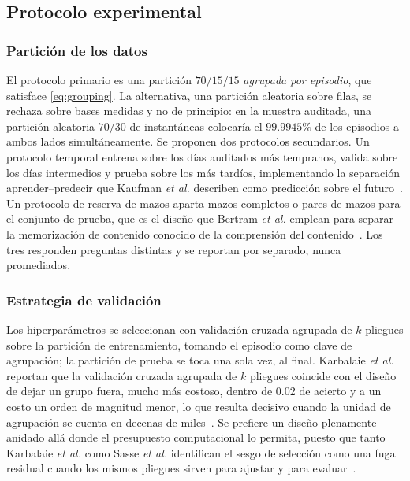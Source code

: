 \documentclass[conference]{IEEEtran}
\begin{document}
\subsection{Protocolo experimental}
\label{subsec:protocol}

\subsubsection{Partici\'on de los datos}
El protocolo primario es una partici\'on $70/15/15$ \emph{agrupada por
episodio}, que satisface \eqref{eq:grouping}. La alternativa, una
partici\'on aleatoria sobre filas, se rechaza sobre bases medidas y no de
principio: en la muestra auditada, una partici\'on aleatoria $70/30$ de
instant\'aneas colocar\'ia el $99.9945\%$ de los episodios a ambos lados
simult\'aneamente. Se proponen dos protocolos secundarios. Un protocolo
temporal entrena sobre los d\'ias auditados m\'as tempranos, valida sobre
los d\'ias intermedios y prueba sobre los m\'as tard\'ios, implementando la
separaci\'on aprender--predecir que Kaufman \textit{et al.} describen como
predicci\'on sobre el futuro~\cite{kaufman_leakage_2011}. Un protocolo de
reserva de mazos aparta mazos completos o pares de mazos para el conjunto de
prueba, que es el dise\~no que Bertram \textit{et al.} emplean para separar
la memorizaci\'on de contenido conocido de la comprensi\'on del
contenido~\cite{bertram_cardrepresentations_2024}. Los tres responden
preguntas distintas y se reportan por separado, nunca promediados.

\subsubsection{Estrategia de validaci\'on}
Los hiperpar\'ametros se seleccionan con validaci\'on cruzada agrupada de
$k$ pliegues sobre la partici\'on de entrenamiento, tomando el episodio como
clave de agrupaci\'on; la partici\'on de prueba se toca una sola vez, al
final. Karbalaie \textit{et al.} reportan que la validaci\'on cruzada
agrupada de $k$ pliegues coincide con el dise\~no de dejar un grupo fuera,
mucho m\'as costoso, dentro de 0.02 de acierto y a un costo un orden de
magnitud menor, lo que resulta decisivo cuando la unidad de agrupaci\'on se
cuenta en decenas de miles~\cite{karbalaie_participantaware_2026}. Se
prefiere un dise\~no plenamente anidado all\'a donde el presupuesto
computacional lo permita, puesto que tanto Karbalaie \textit{et al.} como
Sasse \textit{et al.} identifican el sesgo de selecci\'on como una fuga
residual cuando los mismos pliegues sirven para ajustar y para
evaluar~\cite{karbalaie_participantaware_2026,sasse_leakage_2025}.
\end{document}
